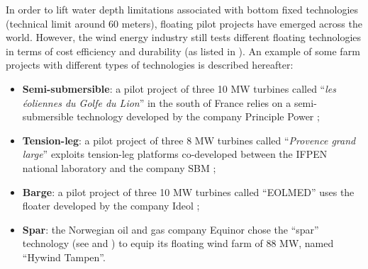 In order to lift water depth limitations associated with bottom fixed technologies (technical limit around 60 meters), floating pilot projects have emerged across the world. 
However, the wind energy industry still tests different floating technologies in terms of cost efficiency and durability (as listed in \citealp{mackinnon_2022_FOWT_table}). 
An example of some farm projects with different types of technologies is described hereafter: 
\begin{itemize}
    \item \textbf{Semi-submersible}: a pilot project of three 10 MW turbines called ``\textit{les éoliennes du Golfe du Lion}'' in the south of France relies on a semi-submersible technology developed by the company Principle Power \citep{cermelli_2018_windfloat};   
    \item \textbf{Tension-leg}: a pilot project of three 8 MW turbines called ``\textit{Provence grand large}'' exploits tension-leg platforms co-developed between the IFPEN national laboratory and the company SBM \citep{caille_2017_TPL_IFPEN}; 
    \item \textbf{Barge}: a pilot project of three 10 MW turbines called ``EOLMED'' uses the floater developed by the company Ideol \citep{guignier_2016_ideol}; 
    \item \textbf{Spar}: the Norwegian oil and gas company Equinor chose the ``spar'' technology (see  and \citealp{driscoll_2016_hywind}) to equip its floating wind farm of 88 MW, named ``Hywind Tampen''. 
\end{itemize}

